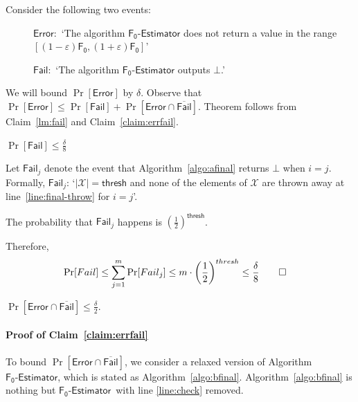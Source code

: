 \documentclass[a4paper,UKenglish,cleveref, autoref, thm-restate]{lipics-v2021}
\makeatletter
\newenvironment{proof*}[1][\proofname]{\par
  \pushQED{\qed}
  \normalfont \partopsep=\z@skip \topsep=\z@skip
  \trivlist
  \item[\hskip\labelsep
        \itshape
    #1\@addpunct{.}]\ignorespaces
}{
  \popQED\endtrivlist\@endpefalse
}
\newcommand{\hybrid}{\ensuremath{\mathsf{F_0\mbox{-}Estimator}}}
\newcommand{\Fo}{\ensuremath{\mathsf{F_0}}}
\newcommand{\Fail}{\mathsf{Fail}}
\newcommand{\thresh}{\mathsf{thresh}}
\makeatother
\begin{document}
\begin{proof*}
Consider the following two events: 

\begin{description}
\item[]$\mathsf{Error}:$ `The algorithm $\hybrid$ does not return a value in the range $[(1-\varepsilon)\Fo, (1+\varepsilon) \Fo]$'
\item[]$\mathsf{Fail}:$ `The algorithm $\hybrid$ outputs $\bot$.'
\end{description}

We will bound $\Pr[\mathsf{Error}]$ by $\delta$. Observe that $\Pr[\mathsf{Error}] \leq \Pr[\mathsf{Fail}] + \Pr [\mathsf{Error} \cap  \overline{\mathsf{Fail}}]$. Theorem follows from Claim~\ref{lm:fail} and Claim~\ref{claim:errfail}.
\end{proof*}

\begin{claim}\label{lm:fail}
$\Pr[\mathsf{Fail}] \leq \frac{\delta}{8}$

\end{claim}
\begin{proof*}

Let $\Fail_j$ denote the event that Algorithm~\ref{algo:afinal} returns $\bot$ when $i=j$. Formally, 
$\mathsf{Fail}_j$: `$|\mathcal{X}| = \thresh$ and none of the elements of $\mathcal{X}$ are thrown away at line~\ref{line:final-throw} for $i=j$'. 

 The probability that $\mathsf{Fail}_j$ happens is $\left(\frac{1}{2}\right)^{\thresh}$. 
 
Therefore,
 \begin{align*}
\Pr[\mathsf{Fail}] \leq \sum_{j=1}^{m} \Pr[\mathsf{Fail}_j] &\leq  m\cdot \left(\frac{1}{2}\right)^{\thresh} \leq \frac{\delta}{8}\qedhere 
 \end{align*}
\end{proof*}


\begin{claim}\label{claim:errfail}
$\Pr [\mathsf{Error} \cap \overline{\mathsf{Fail}}] \leq \frac{\delta}{2}$. 
\end{claim}



\paragraph*{Proof of Claim~\ref{claim:errfail}}
To bound $\Pr [\mathsf{Error} \cap \overline{\mathsf{Fail}}]$, we consider a relaxed version of Algorithm~\hybrid, which is  stated as Algorithm~\ref{algo:bfinal}.  Algorithm~\ref{algo:bfinal} is nothing but \hybrid\ with line \ref{line:check} removed.
\end{document}
